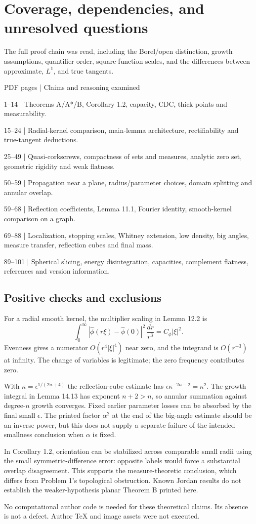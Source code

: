\documentclass[10pt]{article}
\begin{document}
\section*{Coverage, dependencies, and unresolved questions}
The full proof chain was read, including the Borel/open distinction, growth assumptions, quantifier order, square-function scales, and the differences between approximate, \(L^1\), and true tangents.\par
PDF pages | Claims and reasoning examined\par
1–14 | Theorems A/A*/B, Corollary 1.2, capacity, CDC, thick points and measurability.\par
15–24 | Radial-kernel comparison, main-lemma architecture, rectifiability and true-tangent deductions.\par
25–49 | Quasi-corkscrews, compactness of sets and measures, analytic zero set, geometric rigidity and weak flatness.\par
50–59 | Propagation near a plane, radius/parameter choices, domain splitting and annular overlap.\par
59–68 | Reflection coefficients, Lemma 11.1, Fourier identity, smooth-kernel comparison on a graph.\par
69–88 | Localization, stopping scales, Whitney extension, low density, big angles, measure transfer, reflection cubes and final mass.\par
89–101 | Spherical slicing, energy disintegration, capacities, complement flatness, references and version information.\par
\subsection*{Positive checks and exclusions}
For a radial smooth kernel, the multiplier scaling in Lemma 12.2 is \[\int_0^\infty|\widehat\phi(r\xi)-\widehat\phi(0)|^2\,\frac{dr}{r^3}
 =C_\phi|\xi|^2.\] Evenness gives a numerator \(O(r^4|\xi|^4)\) near zero, and the integrand is \(O(r^{-3})\) at infinity. The change of variables is legitimate; the zero frequency contributes zero.\par
With \(\kappa=\epsilon^{1/(2n+4)}\) the reflection-cube estimate has \(\epsilon\kappa^{-2n-2}=\kappa^2\). The growth integral in Lemma 14.13 has exponent \(n+2>n\), so annular summation against degree-\(n\) growth converges. Fixed earlier parameter losses can be absorbed by the final small \(\epsilon\). The printed factor \(\alpha^2\) at the end of the big-angle estimate should be an inverse power, but this does not supply a separate failure of the intended smallness conclusion when \(\alpha\) is fixed.\par
In Corollary 1.2, orientation can be stabilized across comparable small radii using the small symmetric-difference error: opposite labels would force a substantial overlap disagreement. This supports the measure-theoretic conclusion, which differs from Problem 1’s topological obstruction. Known Jordan results do not establish the weaker-hypothesis planar Theorem B printed here.\par
No computational author code is needed for these theoretical claims. Its absence is not a defect. Author TeX and image assets were not executed.\par
\end{document}
